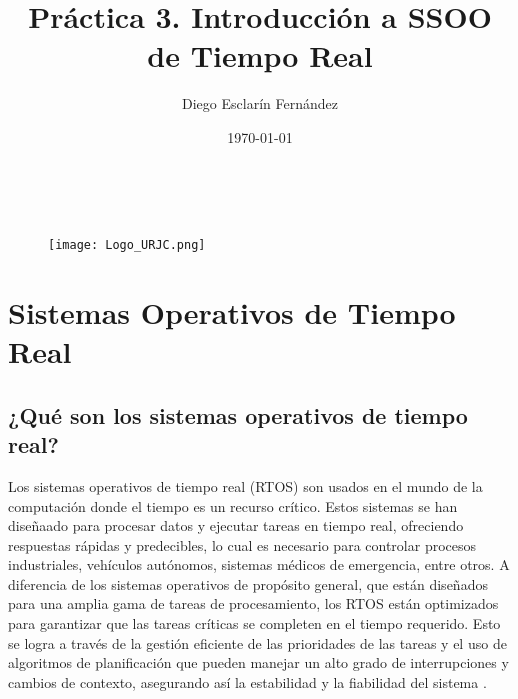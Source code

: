 \documentclass{article}
\title{\Huge \textbf{Práctica 3. Introducción a SSOO de Tiempo Real}}
\author{Diego Esclarín Fernández}
\date{\today}
\begin{document}
\begin{titlepage}
    \maketitle
    \ 
    \begin{figure}[h]
        \centering
        \texttt{[image: Logo\_URJC.png]}
        \label{fig:ejemplo}
    \end{figure}
\end{titlepage}


\section{Sistemas Operativos de Tiempo Real}

\subsection{ ¿Qué son los sistemas operativos de tiempo real?}
Los sistemas operativos de tiempo real (RTOS) son usados en el mundo de la computación donde el tiempo es
un recurso crítico. Estos sistemas se han diseñaado para procesar datos y ejecutar tareas en tiempo real, ofreciendo
respuestas rápidas y predecibles, lo cual es necesario para controlar procesos industriales, vehículos autónomos,
sistemas médicos de emergencia, entre otros. A diferencia de los sistemas operativos de propósito general, que están
diseñados para una amplia gama de tareas de procesamiento, los RTOS están optimizados para garantizar que las
tareas críticas se completen en el tiempo requerido. Esto se logra a través de la gestión eficiente de las prioridades
de las tareas y el uso de algoritmos de planificación que pueden manejar un alto grado de interrupciones y cambios
de contexto, asegurando así la estabilidad y la fiabilidad del sistema \cite{ref1} \cite{ref2} \cite{ref5} \cite{ref6}.
\end{document}
